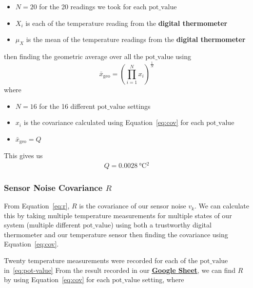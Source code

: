 \documentclass[12pt,a4paper]{article}
\begin{document}
\begin{itemize}
    \item $N=20$ for the 20 readings we took for each $\text{pot\_value}$
    \item $X_i$ is each of the temperature reading from the \textbf{digital thermometer}
    \item $\mu_X$ is the mean of the temperature readings from the \textbf{digital thermometer}
\end{itemize}
then finding the geometric average over all the $\text{pot\_value}$ using
\begin{equation}
    \label{eq:geo-avg}
    \bar{x}_{\mathrm{geo}} = \left( \prod_{i=1}^{N} x_i \right)^{\tfrac{1}{N}}
\end{equation}
where
\begin{itemize}
    \item $N=16$ for the 16 different $\text{pot\_value}$ settings
    \item $x_i$ is the covariance calculated using Equation~\eqref{eq:cov} for each $\text{pot\_value}$
    \item $\bar{x}_{\mathrm{geo}}=Q$
\end{itemize}
This gives us
\begin{align*}
    Q = \SI{0.0028}{\degreeCelsius^2}
\end{align*}

\subsubsection{Sensor Noise Covariance $R$}
From Equation~\eqref{eq:r}, $R$ is the covariance of our sensor noise $v_k$. We can calculate this by taking multiple temperature measurements for multiple states of our system (multiple different $\text{pot\_value}$) using both a trustworthy digital thermometer and our temperature sensor then finding the covariance using Equation~\eqref{eq:cov}.

Twenty temperature measurements were recorded for each of the $\text{pot\_value}$ in~\eqref{eq:pot-value}
From the result recorded in our \href{https://docs.google.com/spreadsheets/d/1mIqAQL7zom7rqrgY63SVOOFBYus10Tk0CKpmR08Oij0/edit?gid=501799072#gid=501799072}{\textbf{\underline{Google Sheet}}}, we can find $R$ by using Equation~\eqref{eq:cov} for each $\text{pot\_value}$ setting, where
\end{document}
